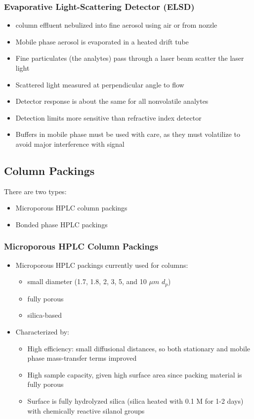 \documentclass[a4paper, 12pt]{article}
\begin{document}
\subsubsection{Evaporative Light-Scattering Detector (ELSD)}

\begin{itemize}
	\item column effluent nebulized into fine aerosol using air or  from nozzle
	\item Mobile phase aerosol is evaporated in a heated drift tube
	\item Fine particulates (the analytes) pass through a laser beam  scatter the laser light
	\item Scattered light measured at perpendicular angle to flow
	\item Detector response is about the same for all nonvolatile analytes
	\item Detection limits more sensitive than refractive index detector
	\item Buffers in mobile phase must be used with care, as they must volatilize to avoid major interference with signal
\end{itemize}

\subsection{Column Packings}

There are two types:

\begin{itemize}
	\item Microporous HPLC column packings
	\item Bonded phase HPLC packings
\end{itemize}

\subsubsection{Microporous HPLC Column Packings}

\begin{itemize}
	\item Microporous HPLC packings currently used for columns:
	\begin{itemize}
		\item small diameter (1.7, 1.8, 2, 3, 5, and 10 $\mu{}m$ $d_p$)
		\item fully porous
		\item silica-based
	\end{itemize}
	\item Characterized by:
	\begin{itemize}
		\item High efficiency: small diffusional distances, so both stationary and mobile phase mass-transfer terms improved
		\item High sample capacity, given high surface area since packing material is fully porous
		\item Surface is fully hydrolyzed silica (silica heated with 0.1 M  for 1-2 days) with chemically reactive silanol groups
	\end{itemize}
\end{itemize}
\end{document}
